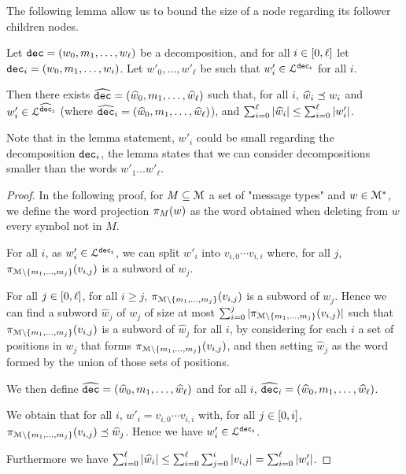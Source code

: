 

The following lemma allow us to bound the size of a node regarding its follower children nodes.

\begin{lemma}
	\label{lem:short-dec}
	Let $\decsymb = (w_0, m_1, \ldots, w_\ell)$ be a decomposition, and for all $i\in \nset{0}{\ell}$ let $\decsymb_i = (w_0, m_1, \ldots, w_i)$.
	Let $w'_0, \ldots, w'_\ell$ be such that $w'_i \in \langdec{\decsymb_i}$ for all $i$.
	
	Then there exists $\widehat{\decsymb} = (\widehat{w}_0, m_1, \ldots, \widehat{w}_\ell)$ such that, for all $i$, $\widehat{w}_i \subword w_i$ and $w'_i \in \langdec{\widehat{\decsymb}_i}$ (where $\widehat{\decsymb}_i = (\widehat{w}_0, m_1, \ldots, \widehat{w}_\ell)$), and $\sum_{i=0}^{\ell} \size{\widehat{w}_i} \leq \sum_{i=0}^{\ell} \size{w'_i}$. 
\end{lemma}

Note that in the lemma statement, $w'_i$ could be small regarding the decomposition $\decsymb_i$, the lemma states that we can consider decompositions smaller than the words $w'_1 \dots w'_\ell$.

\begin{proof}
	In the following proof, for $M \subseteq \messages$ a set of "message types" and $w \in \messages^*$, we define the word projection $\wordproj{w}{M}$ as the word obtained when deleting from $w$ every symbol not in $M$.
	
	For all $i$, as $w'_i \in \langdec{\decsymb_i}$, we can split $w'_i$ into $v_{i,0} \cdots v_{i,i}$ where, for all $j$, $\wordproj{v_{i,j}}{\messages\setminus\set{m_1, \ldots, m_{j}}}$ is a subword of $w_j$. 
	
	For all $j \in \nset{0}{\ell}$, for all $i\geq j$, $\wordproj{v_{i,j}}{\messages\setminus\set{m_1, \ldots, m_{j}}}$ is a subword of $w_j$.
	Hence we can find a subword $\widehat{w}_j$ of $w_j$ of size at most $\sum_{i=0}^{j} \size{\wordproj{v_{i,j}}{\messages\setminus\set{m_1, \ldots, m_{j}}}}$ such that $\wordproj{v_{i,j}}{\messages\setminus\set{m_1, \ldots, m_{j}}}$ is a subword of $\widehat{w}_j$ for all $i$, by considering for each $i$ a set of positions in $w_j$ that forms $\wordproj{v_{i,j}}{\messages\setminus\set{m_1, \ldots, m_{j}}}$, and then setting $\widehat{w}_j$ as the word formed by the union of those sets of positions.
	
	We then define $\widehat{\decsymb} = (\widehat{w}_0, m_1, \ldots, \widehat{w}_\ell)$ and for all $i$, $\widehat{\decsymb}_i = (\widehat{w}_0, m_1, \ldots, \widehat{w}_\ell)$.
	
	We obtain that for all $i$, $w'_i = v_{i,0} \cdots v_{i,i}$ with, for all $j \in \nset{0}{i}$, $\wordproj{v_{i,j}}{\messages\setminus\set{m_1, \ldots, m_j}} \subword \widehat{w}_j$. Hence we have $w'_i \in \langdec{\decsymb_i}$.
	
	Furthermore we have $\sum_{i=0}^{\ell} \size{\widehat{w}_i} \leq \sum_{i=0}^{\ell} \sum_{j=0}^i \size{v_{i,j}} = \sum_{i=0}^{\ell} \size{w'_i}$.
\end{proof}

